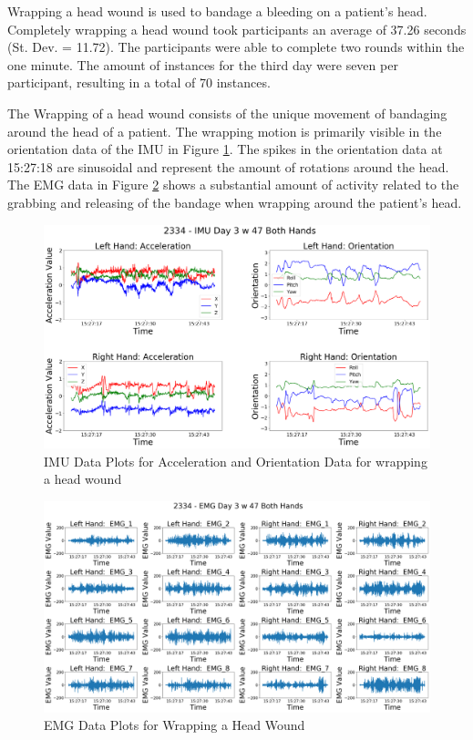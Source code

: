 Wrapping a head wound is used to bandage a bleeding on a patient's head. Completely wrapping a head wound took participants an average of 37.26 seconds (St. Dev. = 11.72). The participants were able to complete two rounds within the one minute. The amount of instances for the third day were seven per participant, resulting in a total of 70 instances.
\par The Wrapping of a head wound consists of the unique movement of bandaging around the head of a patient. The wrapping motion is primarily visible in the orientation data of the IMU in Figure \ref{fig:2334imuday3w47}. The spikes in the orientation data at 15:27:18 are sinusoidal and represent the amount of rotations around the head. The EMG data in Figure \ref{fig:2334emgday3w47} shows a substantial amount of activity related to the grabbing and releasing of the bandage when wrapping around the patient's head.
\begin{figure}[!h]
	\centering
	\includegraphics[width=\linewidth]{pictures/2334_IMU_Day3_w_47}
	\caption{IMU Data Plots for Acceleration and Orientation Data for wrapping a head wound}
	\label{fig:2334imuday3w47}
\end{figure}
\begin{figure}[!h]
	\centering
	\includegraphics[width=\linewidth]{pictures/2334_EMG_Day3_w_47}
	\caption{EMG Data Plots for Wrapping a Head Wound}
	\label{fig:2334emgday3w47}
\end{figure}


